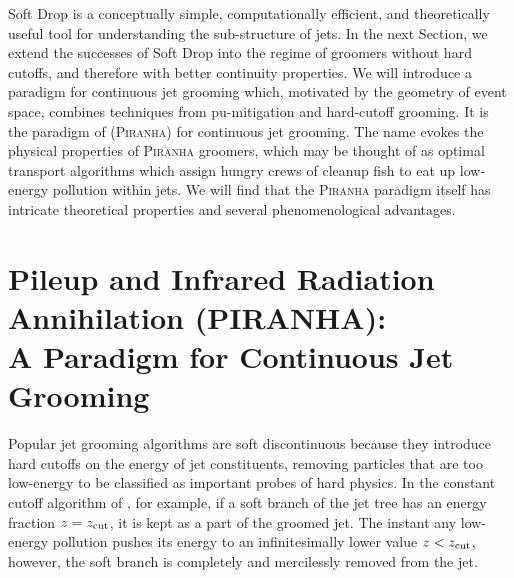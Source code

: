 Soft Drop is a conceptually simple, computationally efficient, and theoretically useful tool for understanding the sub-structure of jets.
%
In the next Section, we extend the successes of Soft Drop into the regime of groomers without hard cutoffs, and therefore with better continuity properties.
%
We will introduce a paradigm for continuous jet grooming which, motivated by the geometry of event space, combines techniques from \gls{pu-mitigation} and hard-cutoff grooming.
%
It is the paradigm of  (\textsc{Piranha}) for continuous jet grooming.
%
The name evokes the physical properties of \textsc{Piranha} groomers, which may be thought of as optimal transport algorithms which assign hungry crews of cleanup fish to eat up low-energy pollution within jets.
%
We will find that the \textsc{Piranha} paradigm itself has intricate theoretical properties and several phenomenological advantages.



\section[\textbf{P}ileup and \textbf{I}nfrared \textbf{R}adiation \textbf{A}n\textbf{n}i\textbf{h}il\textbf{a}tion (\textsc{Piranha}):\\A Paradigm for Continuous Jet Grooming]{\textbf{P}ileup and \textbf{I}nfrared \textbf{R}adiation \textbf{A}n\textbf{n}i\textbf{h}il\textbf{a}tion (PIRANHA):\\A Paradigm for Continuous Jet Grooming}
\label{sec:piranha}


Popular jet grooming algorithms are soft discontinuous because they introduce hard cutoffs on the energy of jet constituents, removing particles that are too low-energy to be classified as important probes of hard physics.
%
In the constant cutoff algorithm of , for example, if a soft branch of the  jet tree has an energy fraction \(z = z_{\rm cut}\), it is kept as a part of the groomed jet.
%
The instant any low-energy pollution pushes its energy to an infinitesimally lower value \(z < z_{\rm cut}\), however, the soft branch is completely and mercilessly removed from the jet.

